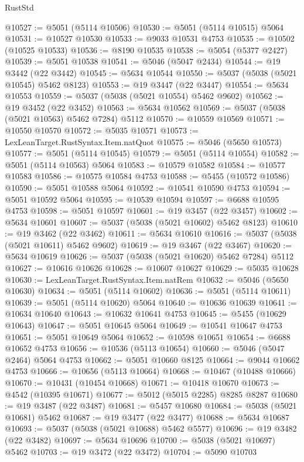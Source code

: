 \begin{lexlean}{RustStd}
\begin{coremodule}
@10527 := @5051 (@5114 @10506)
@10530 := @5051 (@5114 @10515) @5064
@10531 := @10527 @10530
@10533 := @9033 @10531 @4753
@10535 := @10502 (@10525 @10533)
@10536 := @8190 @10535
@10538 := @5054 (@5377 @2427)
@10539 := @5051 @10538
@10541 := @5046 (@5047 @2434)
@10544 := @19 @3442 (@22 @3442)
@10545 := @5634 @10544
@10550 := @5037 (@5038 (@5021 @10545) @5462 @8123)
@10553 := @19 @3447 (@22 @3447)
@10554 := @5634 @10553
@10559 := @5037 (@5038 (@5021 @10554) @5462 @9602)
@10562 := @19 @3452 (@22 @3452)
@10563 := @5634 @10562
@10569 := @5037 (@5038 (@5021 @10563) @5462 @7284) @5112
@10570 := @10559 @10569
@10571 := @10550 @10570
@10572 := @5035 @10571
@10573 := LexLeanTarget.RustSyntax.Item.natQuot
@10575 := @5046 (@5650 @10573)
@10577 := @5051 (@5114 @10545)
@10579 := @5051 (@5114 @10554)
@10582 := @5051 (@5114 @10563) @5064
@10583 := @10579 @10582
@10584 := @10577 @10583
@10586 := @10575 @10584 @4753
@10588 := @5455 (@10572 @10586)
@10590 := @5051 @10588 @5064
@10592 := @10541 @10590 @4753
@10594 := @5051 @10592 @5064
@10595 := @10539 @10594
@10597 := @6688 @10595 @4753
@10598 := @5051 @10597
@10601 := @19 @3457 (@22 @3457)
@10602 := @5634 @10601
@10607 := @5037 (@5038 (@5021 @10602) @5462 @8123)
@10610 := @19 @3462 (@22 @3462)
@10611 := @5634 @10610
@10616 := @5037 (@5038 (@5021 @10611) @5462 @9602)
@10619 := @19 @3467 (@22 @3467)
@10620 := @5634 @10619
@10626 := @5037 (@5038 (@5021 @10620) @5462 @7284) @5112
@10627 := @10616 @10626
@10628 := @10607 @10627
@10629 := @5035 @10628
@10630 := LexLeanTarget.RustSyntax.Item.natRem
@10632 := @5046 (@5650 @10630)
@10634 := @5051 (@5114 @10602)
@10636 := @5051 (@5114 @10611)
@10639 := @5051 (@5114 @10620) @5064
@10640 := @10636 @10639
@10641 := @10634 @10640
@10643 := @10632 @10641 @4753
@10645 := @5455 (@10629 @10643)
@10647 := @5051 @10645 @5064
@10649 := @10541 @10647 @4753
@10651 := @5051 @10649 @5064
@10652 := @10598 @10651
@10654 := @6688 @10652 @4753
@10656 := @10536 (@5113 @10654)
@10660 := @5046 (@5047 @2464) @5064 @4753
@10662 := @5051 @10660 @8125
@10664 := @9044 @10662 @4753
@10666 := @10656 (@5113 @10664)
@10668 := @10467 (@10488 @10666)
@10670 := @10431 (@10454 @10668)
@10671 := @10418 @10670
@10673 := @4542 (@10395 @10671)
@10677 := @5012 (@5015 @2285) @8285 @8287
@10680 := @19 @3487 (@22 @3487)
@10681 := @5457 @10680
@10684 := @5038 (@5021 @10681) @5462
@10687 := @19 @3477 (@22 @3477)
@10688 := @5634 @10687
@10693 := @5037 (@5038 (@5021 @10688) @5462 @5577)
@10696 := @19 @3482 (@22 @3482)
@10697 := @5634 @10696
@10700 := @5038 (@5021 @10697) @5462
@10703 := @19 @3472 (@22 @3472)
@10704 := @5090 @10703

\end{coremodule}
\end{lexlean}
